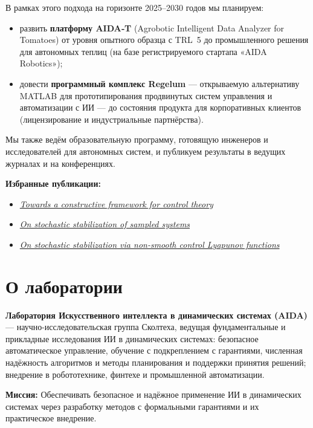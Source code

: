 \documentclass[12pt,a4paper]{article}
\begin{document}
В рамках этого подхода на горизонте 2025–2030 годов мы планируем:
\begin{itemize}
    \item развить \textbf{платформу AIDA‑T} (Agrobotic Intelligent Data Analyzer for Tomatoes) от уровня опытного образца с TRL~5 до промышленного решения для автономных теплиц (на базе регистрируемого стартапа «AIDA Robotics»);
    \item довести \textbf{программный комплекс Regelum} — открываемую альтернативу MATLAB для прототипирования продвинутых систем управления и автоматизации с ИИ — до состояния продукта для корпоративных клиентов (лицензирование и индустриальные партнёрства).
\end{itemize}

Мы также ведём образовательную программу, готовящую инженеров и исследователей для автономных систем, и публикуем результаты в ведущих журналах и на конференциях.

\textbf{Избранные публикации:}
\begin{itemize}
    \item \href{https://arxiv.org/abs/2501.02267}{\textit{Towards a constructive framework for control theory}}
    \item \href{https://arxiv.org/abs/2105.07152}{\textit{On stochastic stabilization of sampled systems}}
    \item \href{https://arxiv.org/abs/2205.13409}{\textit{On stochastic stabilization via non-smooth control Lyapunov functions}}
\end{itemize}

\section{О лаборатории}

\textbf{Лаборатория Искусственного интеллекта в динамических системах (AIDA)} --- научно-исследовательская группа Сколтеха, ведущая фундаментальные и прикладные исследования ИИ в динамических системах: безопасное автоматическое управление, обучение с подкреплением с гарантиями, численная надёжность алгоритмов и методы планирования и поддержки принятия решений; внедрение в робототехнике, финтехе и промышленной автоматизации.

\textbf{Миссия:} Обеспечивать безопасное и надёжное применение ИИ в динамических системах через разработку методов с формальными гарантиями и их практическое внедрение.
\end{document}
